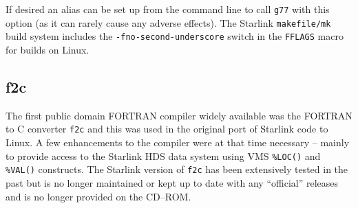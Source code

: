 \documentclass[twoside,11pt]{article}
\newcommand{\xlabel}[1]{}
\renewcommand{\_}{\texttt{\symbol{95}}}
\newcommand{\cdrom}{CD--ROM}
\newcommand{\cdrom}{CD-ROM}
\begin{document}
If desired an alias can be set up from the command line to call
\texttt{g77} with this option (as it can rarely cause any adverse
effects).  The Starlink \texttt{makefile/mk} build system includes the
\texttt{-fno-second-underscore} switch in the \texttt{FFLAGS} macro for
builds on Linux.

\subsection{\xlabel{f2c}f2c}
\label{f2c}

The first public domain FORTRAN compiler widely available was the
FORTRAN to C converter \texttt{f2c} and this was used in the
original port of Starlink code to Linux.  A few enhancements to the
compiler were at that time necessary -- mainly to provide access to the
Starlink HDS data system using VMS \texttt{\%LOC()} and \texttt{\%VAL()}
constructs.  The Starlink version of \texttt{f2c} has been extensively
tested in the past but is no longer maintained or kept up to date with any
``official'' releases and is no longer provided on the \cdrom.
\end{document}
